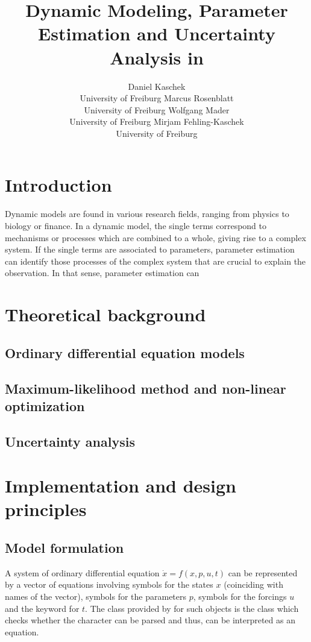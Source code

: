 \documentclass[article]{jss}
\author{Daniel Kaschek\\University of Freiburg \And
	Marcus Rosenblatt\\University of Freiburg \AND
	Wolfgang Mader\\University of Freiburg \And
	Mirjam Fehling-Kaschek\\University of Freiburg}
\title{Dynamic Modeling, Parameter Estimation and Uncertainty Analysis in \proglang{R}}
\begin{document}
\section{Introduction}
	Dynamic models are found in various research fields, ranging from physics to biology or finance. In a dynamic model, the single terms correspond to mechanisms or processes which are combined to a whole, giving rise to a complex system. If the single terms are associated to parameters, parameter estimation can identify those processes of the complex system that are crucial to explain the observation. In that sense, parameter estimation can

\section{Theoretical background}

\subsection{Ordinary differential equation models}

\subsection{Maximum-likelihood method and non-linear optimization}

\subsection{Uncertainty analysis}



\section{Implementation and design principles}

\subsection{Model formulation}

A system of ordinary differential equation $\dot x = f(x, p, u, t)$ can be represented by a  vector of equations involving symbols for the states $x$ (coinciding with names of the vector), symbols for the parameters $p$, symbols for the forcings $u$ and the keyword  for $t$. The class provided by  for such objects is the  class which checks whether the character can be parsed and thus, can be interpreted as an equation.
\end{document}
